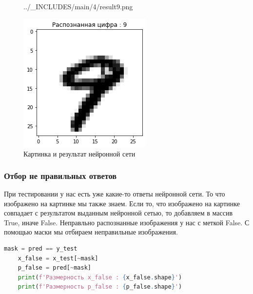 \begin{figure}[!htp]
\begin{minipage}[h]{0.19\linewidth}
        {../_INCLUDES/main/4/result9.png}
    \end{minipage}
    \hfill
    \begin{minipage}[h]{0.19\linewidth}
        \centering
        \includegraphics[width=\linewidth]
        {../_INCLUDES/main/4/result10.png}
    \end{minipage}

    \caption{Картинка и результат нейронной сети}
    \label{fig:4_img_and_result}
\end{figure}



\subsubsection*{Отбор не правильных ответов}

При тестировании у нас есть уже какие-то ответы нейронной сети. То что изображено на картинке мы также знаем. Если то, что изображено на картинке совпадает с результатом выданным нейронной сетью, то добавляем в массив True, иначе False. Неправльно распознанные изображения у нас с меткой False. С помощью маски мы отбираем неправильные изображения.

\begin{lstlisting}[language=Python,]
    mask = pred == y_test
    x_false = x_test[~mask]
    p_false = pred[~mask]
    print(f'Размерность x_false : {x_false.shape}')
    print(f'Размерность p_false : {p_false.shape}')
\end{lstlisting}

